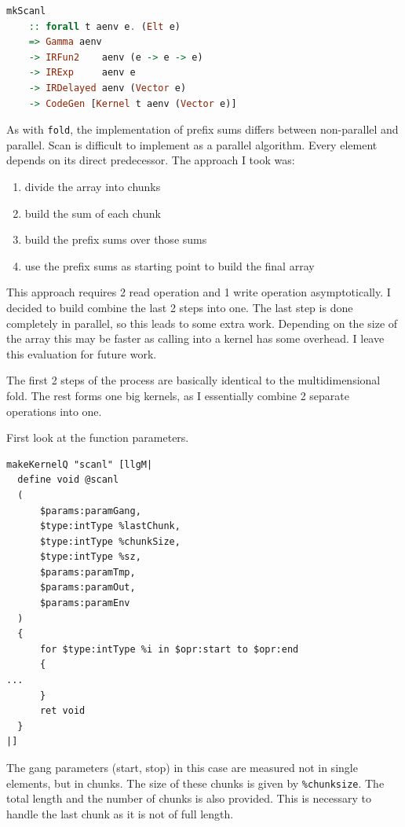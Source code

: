 \documentclass[a4paper,bibliography=totocnumbered,parskip,headsepline]{scrbook}
\begin{document}
\begin{lstlisting}[language=haskell]
mkScanl
    :: forall t aenv e. (Elt e)
    => Gamma aenv
    -> IRFun2    aenv (e -> e -> e)
    -> IRExp     aenv e
    -> IRDelayed aenv (Vector e)
    -> CodeGen [Kernel t aenv (Vector e)]
\end{lstlisting}

As with \lstinline[language=haskell]!fold!, the implementation of prefix sums differs between non-parallel and parallel.
Scan is difficult to implement as a parallel algorithm.
Every element depends on its direct predecessor.
The approach I took was:

\begin{enumerate}[noitemsep]
\item divide the array into chunks
\item build the sum of each chunk
\item build the prefix sums over those sums
\item use the prefix sums as starting point to build the final array
\end{enumerate}

This approach requires 2 read operation and 1 write operation asymptotically.
I decided to build combine the last 2 steps into one.
The last step is done completely in parallel, so this leads to some extra work.
Depending on the size of the array this may be faster as calling into a kernel has some overhead.
I leave this evaluation for future work.

The first 2 steps of the process are basically identical to the multidimensional fold.
The rest forms one big kernels, as I essentially combine 2 separate operations into one.

First look at the function parameters.
\begin{lstlisting}
makeKernelQ "scanl" [llgM|
  define void @scanl
  (
      $params:paramGang,
      $type:intType %lastChunk,
      $type:intType %chunkSize,
      $type:intType %sz,
      $params:paramTmp,
      $params:paramOut,
      $params:paramEnv
  )
  {
      for $type:intType %i in $opr:start to $opr:end
      {
...
      }
      ret void
  }
|]
\end{lstlisting}
The gang parameters (start, stop) in this case are measured not in single elements, but in chunks.
The size of these chunks is given by \lstinline{%chunksize}.
The total length and the number of chunks is also provided.
This is necessary to handle the last chunk as it is not of full length.
\end{document}
